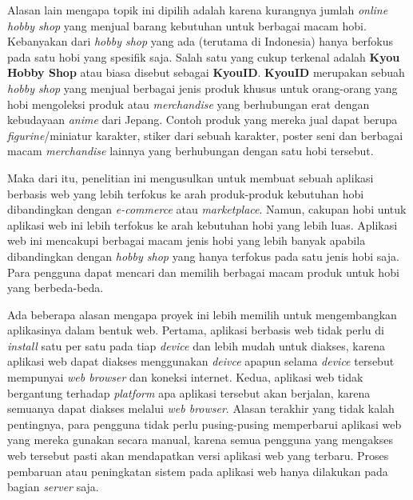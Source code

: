 \documentclass[a4paper]{article}
\begin{document}
Alasan lain mengapa topik ini dipilih adalah karena kurangnya jumlah \textit{online hobby shop} yang menjual barang kebutuhan untuk berbagai macam hobi. Kebanyakan dari \textit{hobby shop} yang ada (terutama di Indonesia) hanya berfokus pada satu hobi yang spesifik saja. Salah satu yang cukup terkenal adalah \textbf{Kyou Hobby Shop} atau biasa disebut sebagai \textbf{KyouID}. \textbf{KyouID} merupakan sebuah \textit{hobby shop} yang menjual berbagai jenis produk khusus untuk orang-orang yang hobi mengoleksi produk atau \textit{merchandise} yang berhubungan erat dengan kebudayaan \textit{anime} dari Jepang. Contoh produk yang mereka jual dapat berupa \textit{figurine}/miniatur karakter, stiker dari sebuah karakter, poster seni dan berbagai macam \textit{merchandise} lainnya yang berhubungan dengan satu hobi tersebut. 

Maka dari itu, penelitian ini mengusulkan untuk membuat sebuah aplikasi berbasis web yang lebih terfokus ke arah produk-produk kebutuhan hobi dibandingkan dengan \textit{e-commerce} atau \textit{marketplace}. Namun, cakupan hobi untuk aplikasi web ini lebih terfokus ke arah kebutuhan hobi yang lebih luas. Aplikasi web ini mencakupi berbagai macam jenis hobi yang lebih banyak apabila dibandingkan dengan \textit{hobby shop} yang hanya terfokus pada satu jenis hobi saja. Para pengguna dapat mencari dan memilih berbagai macam produk untuk hobi yang berbeda-beda.

Ada beberapa alasan mengapa proyek ini lebih memilih untuk mengembangkan aplikasinya dalam bentuk web. Pertama, aplikasi berbasis web tidak perlu di \textit{install} satu per satu pada tiap \textit{device} dan lebih mudah untuk diakses, karena aplikasi web dapat diakses menggunakan \textit{deivce} apapun selama \textit{device} tersebut mempunyai \textit{web browser} dan koneksi internet. Kedua, aplikasi web tidak bergantung terhadap \textit{platform} apa aplikasi tersebut akan berjalan, karena semuanya dapat diakses melalui \textit{web browser}. Alasan terakhir yang tidak kalah pentingnya, para pengguna tidak perlu pusing-pusing memperbarui aplikasi web yang mereka gunakan secara manual, karena semua pengguna yang mengakses web tersebut pasti akan mendapatkan versi aplikasi web yang terbaru. Proses pembaruan atau peningkatan sistem pada aplikasi web hanya dilakukan pada bagian \textit{server} saja.
\end{document}
